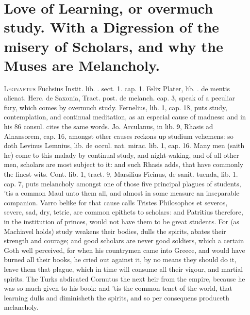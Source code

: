 {%
\section[Love of Learning, or overmuch study.]{Love of Learning, or overmuch study. With a Digression of the misery of Scholars, and why the Muses are Melancholy.}
\lettrine{L}{eonartus} Fuchsius Instit. lib. . sect. 1. cap. 1. Felix Plater,
lib. . de mentis alienat. Herc. de Saxonia, Tract. post. de melanch.
cap. 3, speak of a peculiar fury, which comes by overmuch study.
Fernelius, lib. 1, cap. 18, puts study, contemplation, and
continual meditation, as an especial cause of madness: and in his 86
consul. cites the same words. Jo. Arculanus, in lib. 9, Rhasis ad
Alnansorem, cap. 16, amongst other causes reckons up studium vehemens:
so doth Levinus Lemnius, lib. de occul. nat. mirac. lib. 1, cap. 16.
Many men (saith he) come to this malady by continual study,
and night-waking, and of all other men, scholars are most subject to
it: and such Rhasis adds, that have commonly the finest wits.
Cont. lib. 1, tract. 9, Marsilius Ficinus, de sanit. tuenda, lib. 1.
cap. 7, puts melancholy amongst one of those five principal plagues of
students, 'tis a common Maul unto them all, and almost in some measure
an inseparable companion. Varro belike for that cause calls Tristes
Philosophos et severos, severe, sad, dry, tetric, are common epithets
to scholars: and Patritius therefore, in the institution of
princes, would not have them to be great students. For (as Machiavel
holds) study weakens their bodies, dulls the spirits, abates their
strength and courage; and good scholars are never good soldiers, which
a certain Goth well perceived, for when his countrymen came into
Greece, and would have burned all their books, he cried out against it,
by no means they should do it,  leave them that plague, which in
time will consume all their vigour, and martial spirits. The
Turks abdicated Cornutus the next heir from the empire, because
he was so much given to his book: and 'tis the common tenet of the
world, that learning dulls and diminisheth the spirits, and so per
consequens produceth melancholy.

}
